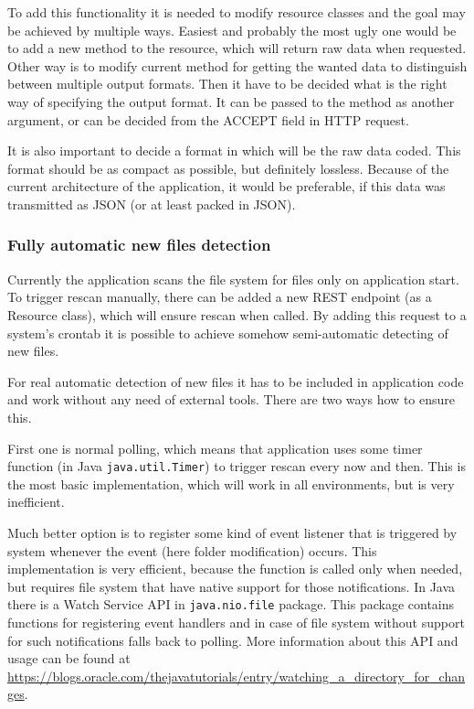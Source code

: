 \documentclass[11pt,a4paper,titlepage,oneside]{report}
\begin{document}
To add this functionality it is needed to modify resource classes and the goal may be achieved by multiple ways. Easiest and probably the most ugly one would be to add a new method to the resource, which will return raw data when requested. Other way is to modify current method for getting the wanted data to distinguish between multiple output formats. Then it have to be decided what is the right way of specifying the output format. It can be passed to the method as another argument, or can be decided from the ACCEPT field in HTTP request.

It is also important to decide a format in which will be the raw data coded. This format should be as compact as possible, but definitely lossless. Because of the current architecture of the application, it would be preferable, if this data was transmitted as JSON (or at least packed in JSON).

\subsubsection{Fully automatic new files detection}
Currently the application scans the file system for files only on application start. To trigger rescan manually, there can be added a new REST endpoint (as a Resource class), which will ensure rescan when called. By adding this request to a system's crontab it is possible to achieve somehow semi-automatic detecting of new files.

For real automatic detection of new files it has to be included in application code and work without any need of external tools. There are two ways how to ensure this.

First one is normal polling, which means that application uses some timer function (in Java \texttt{java.util.Timer}) to trigger rescan every now and then. This is the most basic implementation, which will work in all environments, but is very inefficient.

Much better option is to register some kind of event listener that is triggered by system whenever the event (here folder modification) occurs. This implementation is very efficient, because the function is called only when needed, but requires file system that have native support for those notifications. In Java there is a Watch Service API in \texttt{java.nio.file} package. This package contains functions for registering event handlers and in case of file system without support for such notifications falls back to polling. More information about this API and usage can be found at \url{https://blogs.oracle.com/thejavatutorials/entry/watching_a_directory_for_changes}.
\end{document}
